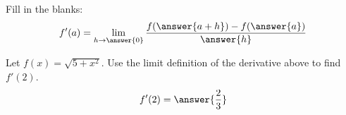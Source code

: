\documentclass{ximera}
\begin{document}
\begin{exercise}

Fill in the blanks:
  \[
  f'(a)=\lim_{h\to\answer{0}}\frac{f(\answer{a+h})-f(\answer{a})}{\answer{h}}
  \]
  
  \begin{exercise}
    Let $f(x)=\sqrt{5+x^2}$. Use the limit definition of the derivative
    above to find $f'(2)$.
    \[
    f'(2)=\answer{\frac{2}{3}}
    \]
  \end{exercise}
\end{exercise}
\end{document}
